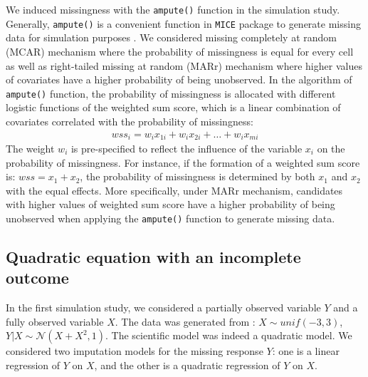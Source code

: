 	We induced missingness with the \texttt{ampute()} function in the simulation study. Generally, \texttt{ampute()} is a convenient function in \texttt{MICE} package to generate missing data for simulation purposes \citep{Schouten2018}. We considered missing completely at random (MCAR) mechanism where the probability of missingness is equal for every cell as well as right-tailed missing at random (MARr) mechanism where higher values of covariates have a higher probability of being unobserved. In the algorithm of \texttt{ampute()} function, the probability of missingness is allocated with different logistic functions of the weighted sum score, which is a linear combination of covariates correlated with the probability of missingness:
	\begin{equation}
		\begin{array}{ll}
			wss_{i} = w_{i}x_{1i} + w_{i}x_{2i} + \dots + w_{i}x_{mi}
		\end{array} 
	\end{equation}
	The weight $w_i$ is pre-specified to reflect the influence of the variable $x_{i}$ on the probability of missingness. For instance, if the formation of a weighted sum score is:
	$wss = x_1 + x_2$, the probability of missingness is determined by both $x_1$ and $x_2$ with the equal effects. More specifically, under MARr mechanism, candidates with higher values of weighted sum score have a higher probability of being unobserved when applying the \texttt{ampute()} function to generate missing data.
	
	\subsection{Quadratic equation with an incomplete outcome}
	In the first simulation study, we considered a partially observed variable $Y$ and a fully observed variable $X$. The data was generated from : $X \sim unif(-3, 3)$, $Y|X \sim \mathcal{N}(X + X^2, 1)$. The scientific model was indeed a quadratic model. We considered two imputation models for the missing response $Y$: one is a linear regression of $Y$ on $X$, and the other is a quadratic regression of $Y$ on $X$. 
	

